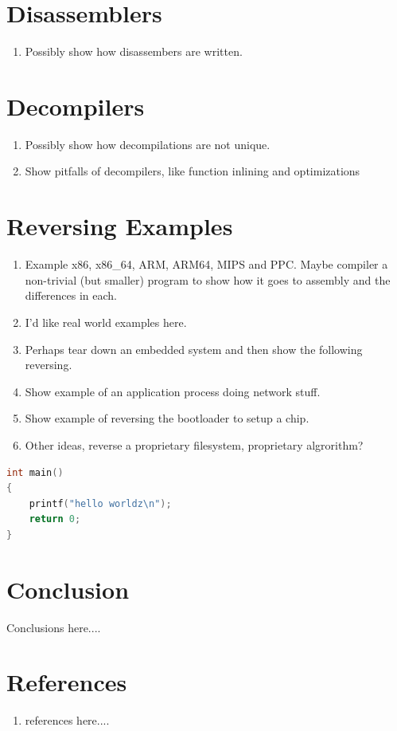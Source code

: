 \documentclass[12pt]{Training}
\begin{document}
\section*{Disassemblers}
\begin{enumerate}
    \item Possibly show how disassembers are written.
\end{enumerate}

\section*{Decompilers}
\begin{enumerate}
    \item Possibly show how decompilations are not unique.
    \item Show pitfalls of decompilers, like function inlining and optimizations
\end{enumerate}

\section*{Reversing Examples}
\begin{enumerate}
    \item Example x86, x86\_64, ARM, ARM64, MIPS and PPC. Maybe compiler a non-trivial (but smaller) program to show how it goes to assembly and the differences in each.
    \item I'd like real world examples here.
    \item Perhaps tear down an embedded system and then show the following reversing.
    \item Show example of an application process doing network stuff.
    \item Show example of reversing the bootloader to setup a chip.
    \item Other ideas, reverse a proprietary filesystem, proprietary algrorithm?
\end{enumerate}

\begin{sectionbox}
\begin{lstlisting}[language=C, caption={Code Example Listing}]
int main()
{
    printf("hello worldz\n");
    return 0;
}
\end{lstlisting}
\end{sectionbox}


\section*{Conclusion}
Conclusions here....

\section*{References}
\begin{enumerate}
	\item references here....
\end{enumerate}
\end{document}
